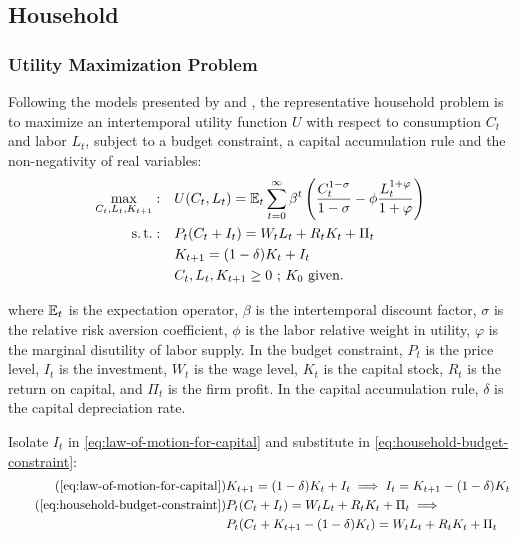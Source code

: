 \documentclass[
	thesis.tex
	]{subfiles}
\begin{document}
\subsection{Household}

\subsubsection*{Utility Maximization Problem}


Following the models presented by \textcite{costa_junior_understanding_2016} and \textcite{solis-garcia_ucb_2022}, the representative household problem is to maximize an intertemporal utility function $U$ with respect to consumption $C_t$ and labor $L_t$, subject to a budget constraint, a capital accumulation rule and the non-negativity of real variables:
\begin{align}
	\label{eq:household-utility-function}
	\max_{C_t,L_t,K_{t+1}}: \quad & U(C_t,L_t) = {\mathbb{E}_{t}} \sum_{t=0}^{\infty} \beta^t \left(\frac{C_t^{1-\sigma}}{1-\sigma} - \phi \frac{L_t^{1+\varphi}}{1+\varphi} \right) \\
	\label{eq:household-budget-constraint}
	\operatorname{s.t.}: \quad & P_t (C_t + I_t) = W_t L_t + R_t K_t + \Pi_t \\
	\label{eq:law-of-motion-for-capital}
	\quad & K_{t+1} = (1-\delta)K_t + I_t \\
	\quad & C_t,L_t,K_{t+1} \geq 0 \text{ ; $K_0$ given.} \nonumber
\end{align}

where ${\mathbb{E}_{t}}$ is the expectation operator, $\beta$ is the intertemporal discount factor, $\sigma$ is the relative risk aversion coefficient, $\phi$ is the labor relative weight in utility, $\varphi$ is the marginal disutility of labor supply. In the budget constraint, $P_t$ is the price level, $I_t$ is the investment, $W_t$ is the wage level, $K_t$ is the capital stock, $R_t$ is the return on capital, and $\Pi_t$ is the firm profit. In the capital accumulation rule, $\delta$ is the capital depreciation rate.

Isolate $I_t$ in \ref{eq:law-of-motion-for-capital} and substitute in \ref{eq:household-budget-constraint}:
\begin{align}
	\tag{\ref{eq:law-of-motion-for-capital}}
	& K_{t+1} = (1-\delta)K_t + I_t \implies I_t = K_{t+1} - (1-\delta)K_t \\
	\tag{\ref{eq:household-budget-constraint}}
	& P_t (C_t + I_t) = W_t L_t + R_t K_t + \Pi_t \implies \\
	\label{eq:household-budget-constraint-2}
	& P_t (C_t + K_{t+1} - (1-\delta)K_t) = W_t L_t + R_t K_t + \Pi_t
\end{align}
\end{document}
